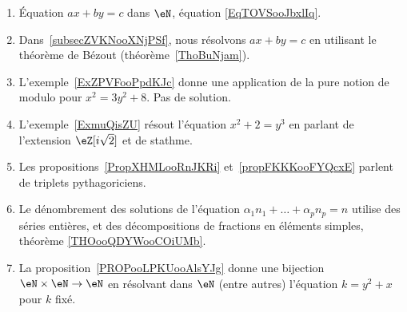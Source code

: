 
\begin{enumerate}
    \item Équation \( ax+by=c\) dans \( \eN\), équation \eqref{EqTOVSooJbxlIq}.
    \item Dans~\ref{subsecZVKNooXNjPSf}, nous résolvons \( ax+by=c\) en utilisant le théorème de Bézout (théorème~\ref{ThoBuNjam}).
    \item L'exemple~\ref{ExZPVFooPpdKJc} donne une application de la pure notion de modulo pour \( x^2=3y^2+8\). Pas de solution.
    \item L'exemple~\ref{ExmuQisZU} résout l'équation \( x^2+2=y^3\) en parlant de l'extension \( \eZ[i\sqrt{2}]\) et de stathme.
    \item Les propositions~\ref{PropXHMLooRnJKRi} et~\ref{propFKKKooFYQcxE} parlent de triplets pythagoriciens.
    \item Le dénombrement des solutions de l'équation \( \alpha_1 n_1+\ldots+\alpha_p n_p=n\) utilise des séries entières, et des décompositions de fractions en éléments simples, théorème \ref{THOooQDYWooCOiUMb}.
    \item La proposition~\ref{PROPooLPKUooAlsYJg} donne une bijection \( \eN\times \eN\to \eN\) en résolvant dans \( \eN\) (entre autres) l'équation \( k=y^2+x\) pour \( k\) fixé.
\end{enumerate}
